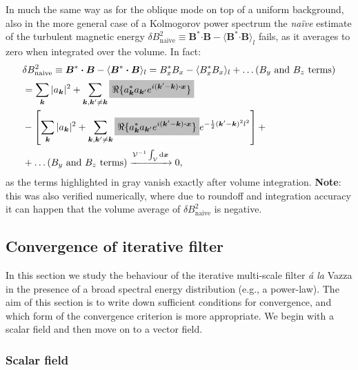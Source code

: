 \documentclass[]{article}
\newcommand{\mathcolorbox}[2]{\colorbox{#1}{$\displaystyle #2$}}
\newcommand{\bcdot}{\bm{\cdot}}
\begin{document}
In much the same way as for the oblique mode on top of a uniform background, also in the more general case of a Kolmogorov power spectrum the \textit{na\"{i}ve} estimate of the turbulent magnetic energy $\delta B^2_{\text{naive}} \equiv \bm B^* \bcdot\bm B - \langle \bm B^* \bcdot\bm B \rangle_l  $ fails, as it averages to zero when integrated over the volume. In fact:
%
\begin{align}
	&\delta B^2_{\text{naive}} \equiv \bm B^* \bcdot\bm B - \langle \bm B^* \bcdot\bm B \rangle_l =  B_x^*  B_x - \langle B_x^*  B_x \rangle_l + \ldots \text{($B_y$ and $B_z$ terms)} \nonumber \\
	& = \sum_{\bm k} |a_{\bm k}|^2  + \sum_{\bm k, \bm k' \neq \bm k} \mathcolorbox{lgray}{\Re \lbrace a_{\bm k}^* a_{\bm k'} e^{i (\bm k' - \bm k) \bcdot\bm x } \rbrace} \nonumber \\
	& - \left[ \sum_{\bm k} |a_{\bm k}|^2  + \sum_{\bm k, \bm k' \neq \bm k} \mathcolorbox{lgray}{\Re \lbrace a_{\bm k}^* a_{\bm k'} e^{i (\bm k' - \bm k) \bcdot\bm x } \rbrace} e^{-\frac{1}{2} (\bm k' - \bm k)^2 l^2} \right] + \nonumber \\
	& + \ldots \text{($B_y$ and $B_z$ terms)} \xrightarrow{\mathcal{V}^{-1}\int_\mathcal{V} \mathrm{d} \bm x}  0,
\end{align}
%
as the terms highlighted in gray vanish exactly after volume integration. \textbf{Note}: this was also verified numerically, where due to roundoff and integration accuracy it can happen that the volume average of $\delta B^2_{\text{naive}}$ is negative.


\subsection{Convergence of iterative filter}

In this section we study the behaviour of the iterative multi-scale filter \textit{\'{a} la} Vazza in the presence of a broad spectral energy distribution (e.g., a power-law). The aim of this section is to write down sufficient conditions for convergence, and which form of the convergence criterion is more appropriate. We begin with a scalar field and then move on to a vector field.

\subsubsection{Scalar field}
\end{document}

